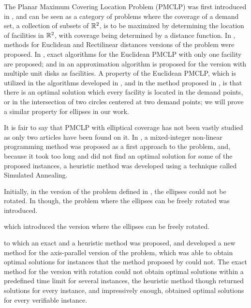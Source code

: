 The Planar Maximum Covering Location Problem (PMCLP) was first introduced in \cite{church:1984}, and can be seen as a category of problems where the coverage of a demand set, a collection of subsets of $\mathbb{R}^2$, is to be maximized by determining the location of facilities in $\mathbb{R}^2$, with coverage being determined by a distance function.
In \cite{church:1984}, methods for Euclidean and Rectilinear distances versions of the problem were proposed.
In \cite{drezner, chazelle:1986}, exact algorithms for the Euclidean PMCLP with only one facility are proposed; and in \cite{cabello:2006} an approximation algorithm is proposed for the version with multiple unit disks as facilities.
A property of the Euclidean PMCLP, which is utilized in the algorithms developed in \cite{drezner, chazelle:1986, cabello:2006}, and in the method proposed in \cite{church:1984}, is that there is an optimal solution which every facility is located in the demand points, or in the intersection of two circles centered at two demand points; we will prove a similar property for ellipses in our work.

It is fair to say that PMCLP with elliptical coverage has not been vastly studied as only two articles have been found on it. In \cite{canbolat}, a mixed-integer non-linear programming method was proposed as a first approach to the problem, and, because it took too long and did not find an optimal solution for some of the proposed instances, a heuristic method was developed using a technique called Simulated Annealing. 

Initially, in the version of the problem defined in \cite{canbolat}, the ellipses could not be rotated. In \cite{andreta} though, the problem where the ellipses can be freely rotated was introduced.

which introduced the version where the ellipses can be freely rotated. 

to which an exact and a heuristic method was proposed, and developed a new method for the axis-parallel version of the problem, which was able to obtain optimal solutions for instances that the method proposed by \cite{canbolat} could not.
The exact method for the version with rotation could not obtain optimal solutions within a predefined time limit for several instances, the heuristic method though returned solutions for every instance, and impressively enough, obtained optimal solutions for every verifiable instance.

